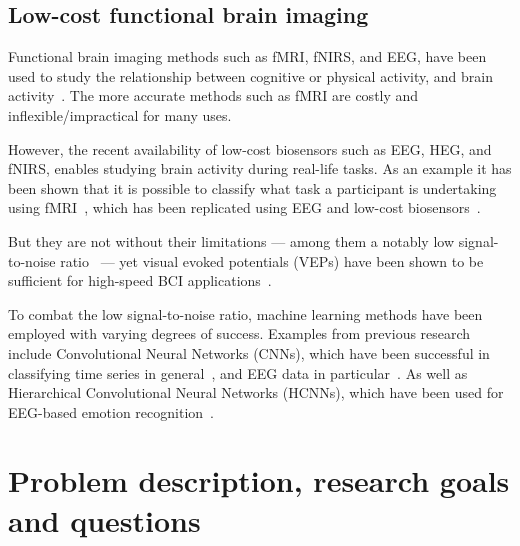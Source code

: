 \documentclass{IEEEtran}
\begin{document}
\begin{refsection}

\subsection{Low-cost functional brain imaging}

Functional brain imaging methods such as fMRI, fNIRS, and EEG, have been used to study the relationship between cognitive or physical activity, and brain activity~\cite{floyd_decoding_2017,hong_classification_2015, fucci_replication_2019}. The more accurate methods such as fMRI are costly and inflexible/impractical for many uses.

However, the recent availability of low-cost biosensors such as EEG, HEG, and fNIRS, enables studying brain activity during real-life tasks. As an example it has been shown that it is possible to classify what task a participant is undertaking using fMRI~\cite{floyd_decoding_2017}, which has been replicated using EEG and low-cost biosensors~\cite{fucci_replication_2019}.

But they are not without their limitations --- among them a notably low signal-to-noise ratio~\cite{mcfarland_eeg-based_2017} --- yet visual evoked potentials (VEPs) have been shown to be sufficient for high-speed BCI applications~\cite{spuler_high-speed_2017}.

To combat the low signal-to-noise ratio, machine learning methods have been employed with varying degrees of success. Examples from previous research include Convolutional Neural Networks (CNNs), which have been successful in classifying time series in general~\cite{zhao_convolutional_2017}, and EEG data in particular~\cite{schirrmeister_deep_2017}. As well as Hierarchical Convolutional Neural Networks (HCNNs), which have been used for EEG-based emotion recognition~\cite{li_hierarchical_2018}.



\section{Problem description, research goals and questions}



\end{refsection}
\end{document}
